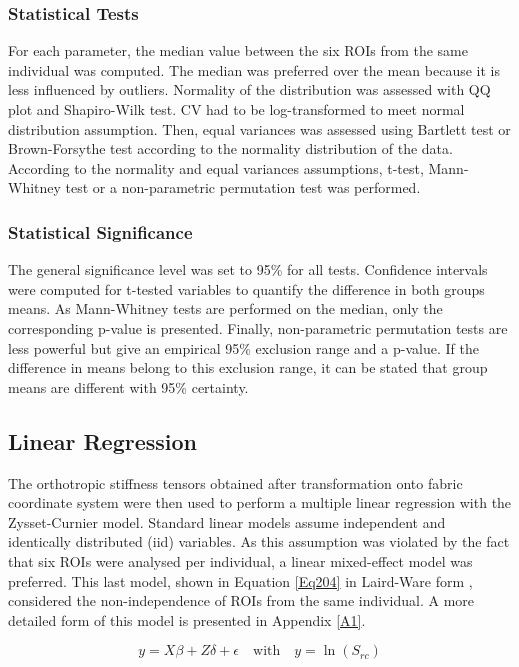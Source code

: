 \documentclass[a4paper,fleqn]{DC_ArtStyle}
\begin{document}
\subsubsection{Statistical Tests}
For each parameter, the median value between the six ROIs from the same individual was computed. The median was preferred over the mean because it is less influenced by outliers. Normality of the distribution was assessed with QQ plot and Shapiro-Wilk test. CV had to be log-transformed to meet normal distribution assumption. Then, equal variances was assessed using Bartlett test or Brown-Forsythe test according to the normality distribution of the data. According to the normality and equal variances assumptions, t-test, Mann-Whitney test or a non-parametric permutation test was performed. 

\subsubsection{Statistical Significance}
The general significance level was set to 95\% for all tests. Confidence intervals were computed for t-tested variables to quantify the difference in both groups means. As Mann-Whitney tests are performed on the median, only the corresponding p-value is presented. Finally, non-parametric permutation tests are less powerful but give an empirical 95\% exclusion range and a p-value. If the difference in means belong to this exclusion range, it can be stated that group means are different with 95\% certainty.

\subsection{Linear Regression}
The orthotropic stiffness tensors obtained after transformation onto fabric coordinate system were then used to perform a multiple linear regression with the Zysset-Curnier model. Standard linear models assume independent and identically distributed (iid) variables. As this assumption was violated by the fact that six ROIs were analysed per individual, a linear mixed-effect model was preferred. This last model, shown in Equation \ref{Eq204} in Laird-Ware form \cite{Laird1982}, considered the non-independence of ROIs from the same individual. A more detailed form of this model is presented in Appendix \ref{A1}.

\begin{equation}
	y = X \beta + Z \delta + \epsilon \quad \text{with} \quad y = \ln(S_{rc})
	\label{Eq204}
\end{equation}
\end{document}

